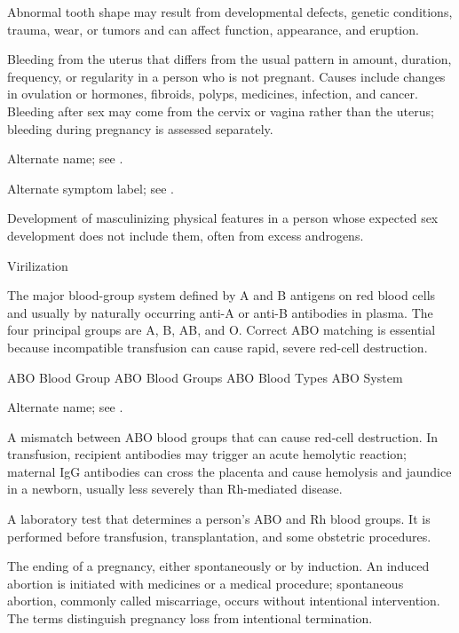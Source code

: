  Abnormal tooth shape may result from developmental defects, genetic conditions, trauma, wear, or tumors and can affect function, appearance, and eruption.

 Bleeding from the uterus that differs from the usual pattern in amount, duration, frequency, or regularity in a person who is not pregnant. Causes include changes in ovulation or hormones, fibroids, polyps, medicines, infection, and cancer. Bleeding after sex may come from the cervix or vagina rather than the uterus; bleeding during pregnancy is assessed separately.

 Alternate name; see .

 Alternate symptom label; see .

 Development of masculinizing physical features in a person whose expected sex development does not include them, often from excess androgens.

\synonyms
Virilization

 The major blood-group system defined by A and B antigens on red blood cells and usually by naturally occurring anti-A or anti-B antibodies in plasma. The four principal groups are A, B, AB, and O. Correct ABO matching is essential because incompatible transfusion can cause rapid, severe red-cell destruction.

\synonyms
ABO Blood Group
ABO Blood Groups
ABO Blood Types
ABO System

 Alternate name; see .

 A mismatch between ABO blood groups that can cause red-cell destruction. In transfusion, recipient antibodies may trigger an acute hemolytic reaction; maternal IgG antibodies can cross the placenta and cause hemolysis and jaundice in a newborn, usually less severely than Rh-mediated disease.

 A laboratory test that determines a person's ABO and Rh blood groups. It is performed before transfusion,
transplantation, and some obstetric procedures.

 The ending of a pregnancy, either spontaneously or by induction. An induced abortion is initiated
with medicines or a medical procedure; spontaneous abortion, commonly called miscarriage, occurs without intentional
intervention. The terms distinguish pregnancy loss from intentional termination.

